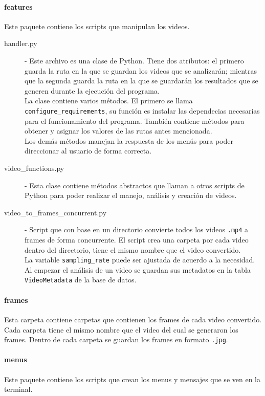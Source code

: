 \paragraph{features}
\noindent Este paquete contiene los scripts que manipulan los videos.
\begin{description}
    \item[handler.py] - Este archivo es una clase de Python. Tiene dos atributos: el primero guarda la ruta en la que se guardan los videos que se analizarán; mientras que la segunda guarda la ruta en la que se guardarán los resultados que se generen durante la ejecución del programa. \\La clase contiene varios métodos. El primero se llama \texttt{configure\_requirements}, su función es instalar las dependecias necesarias para el funcionamiento del programa. También contiene métodos para obtener y asignar los valores de las rutas antes mencionada. \\Los demás métodos manejan la respuesta de los menús para poder direccionar al usuario de forma correcta.
    
    \item[video\_functions.py] - Esta clase contiene métodos abstractos que llaman a otros scripts de Python para poder realizar el manejo, análisis y creación de videos.
    
    \item[video\_to\_frames\_concurrent.py] - Script que con base en un directorio convierte todos los videos \texttt{.mp4} a frames de forma concurrente. El script crea una carpeta por cada video dentro del directorio, tiene el mismo nombre que el video convertido.\\ La variable \texttt{sampling\_rate} puede ser ajustada de acuerdo a la necesidad. Al empezar el análisis de un video se guardan sus metadatos en la tabla \texttt{VideoMetadata} de la base de datos.
\end{description}

\paragraph{frames}
\noindent Esta carpeta contiene carpetas que contienen los frames de cada video convertido. Cada carpeta tiene el mismo nombre que el video del cual se generaron los frames. Dentro de cada carpeta se guardan los frames en formato \texttt{.jpg}.

\paragraph{menus}
\noindent Este paquete contiene los scripts que crean los menus y mensajes que se ven en la terminal.
